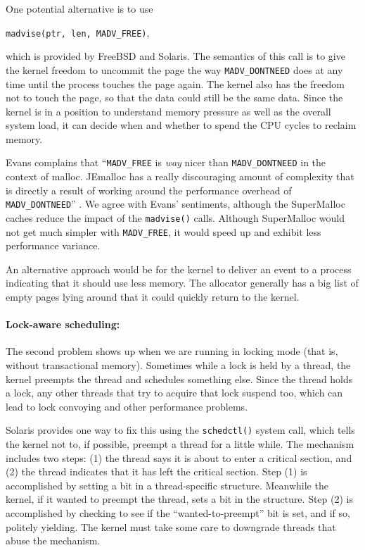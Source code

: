 \documentclass[pldi]{sigplanconf-pldi15}
\newcommand{\code}[1]{\texttt{#1}}
\begin{document}
One potential alternative is to use
\begin{center}
\code{madvise(ptr, len, MADV_FREE)},
\end{center}
which is provided by FreeBSD and Solaris.  The semantics of this call
is to give the kernel freedom to uncommit the page the way
\code{MADV_DONTNEED} does at any time until the process touches the
page again.  The kernel also has the freedom not to touch the page, so
that the data could still be the same data.  Since the kernel is in a
position to understand memory pressure as well as the overall system
load, it can decide when and whether to spend the CPU cycles to
reclaim memory.

Evans complains that ``\code{MADV_FREE} is \textit{way} nicer than
\code{MADV_DONTNEED} in the context of malloc.  JEmalloc has a really
discouraging amount of complexity that is directly a result of working
around the performance overhead of \code{MADV_DONTNEED}''
\cite{Evans12}.  We agree with Evans' sentiments, although the
SuperMalloc caches reduce the impact of the \code{madvise()} calls.
Although SuperMalloc would not get much simpler with \code{MADV_FREE},
it would speed up and exhibit less performance variance.

An alternative approach would be for the kernel to deliver an event to
a process indicating that it should use less memory.  The allocator
generally has a big list of empty pages lying around that it could
quickly return to the kernel.

{\paragraph{Lock-aware scheduling:}} The second problem shows up when
we are running in locking mode (that is, without transactional
memory).  Sometimes while a lock is held by a thread, the kernel
preempts the thread and schedules something else.  Since the thread
holds a lock, any other threads that try to acquire that lock suspend
too, which can lead to lock convoying and other performance problems.

Solaris provides one way to fix this using the \code{schedctl()}
system call, which tells the kernel not to, if possible, preempt a
thread for a little while\cite{Dice11}.  The mechanism includes two
steps: (1) the thread says it is about to enter a critical section,
and (2) the thread indicates that it has left the critical section.
Step (1) is accomplished by setting a bit in a thread-specific
structure.  Meanwhile the kernel, if it wanted to preempt the thread,
sets a bit in the structure.  Step (2) is accomplished by checking to
see if the ``wanted-to-preempt'' bit is set, and if so, politely
yielding.  The kernel must take some care to downgrade threads that
abuse the mechanism.
\end{document}
